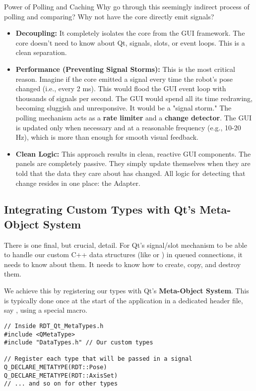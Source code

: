 \begin{tipbox}{Power of Polling and Caching}
Why go through this seemingly indirect process of polling and comparing? Why not have the core directly emit signals?
\begin{itemize}
    \item \textbf{Decoupling:} It completely isolates the core from the GUI framework. The core doesn't need to know about Qt, signals, slots, or event loops. This is a clean separation.
    \item \textbf{Performance (Preventing Signal Storms):} This is the most critical reason. Imagine if the core emitted a signal every time the robot's pose changed (i.e., every 2 ms). This would flood the GUI event loop with thousands of signals per second. The GUI would spend all its time redrawing, becoming sluggish and unresponsive. It would be a "signal storm." The polling mechanism acts as a \textbf{rate limiter} and a \textbf{change detector}. The GUI is updated only when necessary and at a reasonable frequency (e.g., 10-20 Hz), which is more than enough for smooth visual feedback.
    \item \textbf{Clean Logic:} This approach results in clean, reactive GUI components. The panels are completely passive. They simply update themselves when they are told that the data they care about has changed. All logic for detecting that change resides in one place: the Adapter.
\end{itemize}
\end{tipbox}

\subsection{Integrating Custom Types with Qt's Meta-Object System}
\label{subsec:qt_metatypes}

There is one final, but crucial, detail. For Qt's signal/slot mechanism to be able to handle our custom C++ data structures (like  or ) in queued connections, it needs to know about them. It needs to know how to create, copy, and destroy them.

We achieve this by registering our types with Qt's \textbf{Meta-Object System}. This is typically done once at the start of the application in a dedicated header file, say , using a special macro.

\begin{verbatim}
// Inside RDT_Qt_MetaTypes.h
#include <QMetaType>
#include "DataTypes.h" // Our custom types

// Register each type that will be passed in a signal
Q_DECLARE_METATYPE(RDT::Pose)
Q_DECLARE_METATYPE(RDT::AxisSet)
// ... and so on for other types
\end{verbatim}
\label{lst:metatypes}


